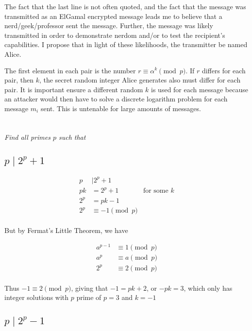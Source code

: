 \documentclass[12pt]{article}
\begin{document}
    The fact that the last line is not often quoted, and the fact that the message was transmitted as an ElGamal encrypted message leads me to believe that a nerd/geek/professor sent the message. Further, the message was likely transmitted in order to demonstrate nerdom and/or to test the recipient's capabilities. I propose that in light of these likelihoods, the transmitter be named Alice.

    The first element in each pair is the number $r \equiv \alpha^k \pmod{p}$. If $r$ differs for each pair, then $k$, the secret random integer Alice generates also must differ for each pair. It is important ensure a different random $k$ is used for each message because an attacker would then have to solve a discrete logarithm problem for each message $m_i$ sent. This is untenable for large amounts of messages.

\newpage

\section{} \textit{Find all primes $p$ such that}

    \subsection{$p \mid 2^p + 1$}

        \begin{align*}
            p &\mid 2^p + 1\\
            pk &= 2^p + 1 &\text{for some $k$}\\
            2^p &= pk - 1\\
            2^p &\equiv -1 \pmod{p}\\
        \end{align*}

        But by Fermat's Little Theorem, we have

        \begin{align*}
            a^{p - 1} &\equiv 1 \pmod{p}\\
            a^p &\equiv a \pmod{p}\\
            2^p &\equiv 2 \pmod{p}\\
        \end{align*}

        Thus $-1 \equiv 2 \pmod{p}$, giving that $-1 = pk + 2$, or $-pk = 3$, which only has integer solutions with $p$ prime of $p=3$ and $k=-1$

    \subsection{$p \mid 2^p - 1$}
\end{document}
